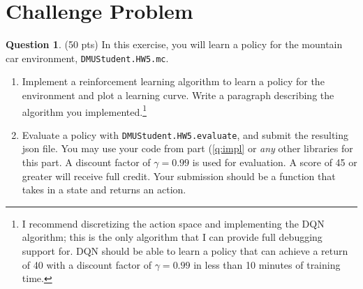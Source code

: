 \documentclass{article}
\theoremstyle{definition}
\newtheorem{question}[thm]{Question}
\begin{document}
\section{Challenge Problem}

\begin{question}
    (50 pts) In this exercise, you will learn a policy for the mountain car environment, \texttt{DMUStudent.HW5.mc}.
    \begin{enumerate}[label=\alph*)]
        \item Implement a reinforcement learning algorithm to learn a policy for the environment and plot a learning curve. Write a paragraph describing the algorithm you implemented.\footnote{I recommend discretizing the action space and implementing the DQN algorithm; this is the only algorithm that I can provide full debugging support for. DQN should be able to learn a policy that can achieve a return of 40 with a discount factor of $\gamma=0.99$ in less than 10 minutes of training time.}\label{q:impl}
        \item Evaluate a policy with \texttt{DMUStudent.HW5.evaluate}, and submit the resulting json file. You may use your code from part (\ref{q:impl} or \emph{any} other libraries for this part. A discount factor of $\gamma=0.99$ is used for evaluation. A score of 45 or greater will receive full credit. Your submission should be a function that takes in a state and returns an action.
    \end{enumerate}
\end{question}
\end{document}
